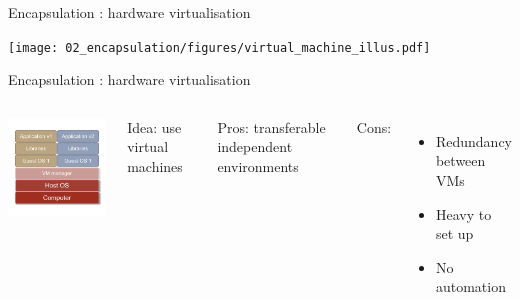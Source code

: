 \begin{frame}{Encapsulation : hardware virtualisation}

\texttt{[image: 02\_encapsulation/figures/virtual\_machine\_illus.pdf]}

\end{frame}

\begin{frame}{Encapsulation : hardware virtualisation}
\begin{columns}

\includegraphics[width=6cm]{02_encapsulation/figures/intro_hardware_virtualisation_54.pdf}

Idea: use virtual machines

Pros:  transferable independent environments

Cons:
\begin{itemize}
  \item Redundancy between VMs
  \item Heavy to set up
  \item No automation
\end{itemize}

\end{columns}
\end{frame}

